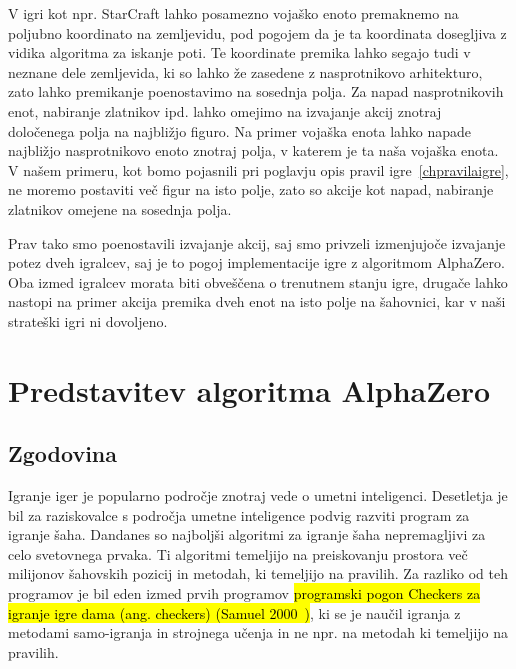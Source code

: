 \documentclass[a4paper, 12pt]{book}
\begin{document}
V igri kot npr. StarCraft lahko posamezno vojaško enoto premaknemo na poljubno koordinato na zemljevidu, pod pogojem da je ta koordinata dosegljiva z vidika algoritma za iskanje poti.
Te koordinate premika lahko segajo tudi v neznane dele zemljevida, ki so lahko že zasedene z nasprotnikovo arhitekturo, zato lahko premikanje poenostavimo na sosednja polja.
Za napad nasprotnikovih enot, nabiranje zlatnikov ipd. lahko omejimo na izvajanje akcij znotraj določenega polja na najbližjo figuro.
Na primer vojaška enota lahko napade najbližjo nasprotnikovo enoto znotraj polja, v katerem je ta naša vojaška enota.
V našem primeru, kot bomo pojasnili pri poglavju opis pravil igre~\ref{chpravilaigre}, ne moremo postaviti več figur na isto polje, zato so akcije kot napad, nabiranje zlatnikov omejene na sosednja polja.

Prav tako smo poenostavili izvajanje akcij, saj smo privzeli izmenjujoče izvajanje potez dveh igralcev, saj je to pogoj implementacije igre z algoritmom AlphaZero.
Oba izmed igralcev morata biti obveščena o trenutnem stanju igre, drugače lahko nastopi na primer akcija premika dveh enot na isto polje na šahovnici, kar v naši strateški igri ni dovoljeno.


\chapter{Predstavitev algoritma AlphaZero}
\label{alphazero}
\section{Zgodovina}

Igranje iger je popularno področje znotraj vede o umetni inteligenci. 
Desetletja je bil za raziskovalce s področja umetne inteligence podvig razviti program za igranje šaha.
Dandanes so najboljši algoritmi za igranje šaha nepremagljivi za celo svetovnega prvaka.
Ti algoritmi temeljijo na preiskovanju prostora več milijonov šahovskih pozicij in metodah, ki temeljijo na pravilih.
Za razliko od teh programov je bil eden izmed prvih programov \hl{programski pogon Checkers za igranje igre dama (ang. checkers) (Samuel 2000~{\cite{samuel2000some}})}, ki se je naučil igranja z metodami samo-igranja in strojnega učenja in ne npr. na metodah ki temeljijo na pravilih.
\end{document}
